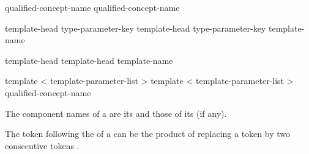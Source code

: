 \documentclass{wg21}
\begin{document}
\begin{bnf}
    \br
    \br
\end{bnf}

\begin{bnf}
    \br
    qualified-concept-name \br
    qualified-concept-name \terminal{<}  \terminal{>}
\end{bnf}

\begin{addedblock}

\begin{bnf}
\br
template-head type-parameter-key  \br
template-head type-parameter-key  \terminal{=}  template-name
\end{bnf}

\begin{bnf}
    \br
    template-head   \br
    template-head   \terminal{=}  template-name
\end{bnf}

\begin{bnf}
    \br
    template < template-parameter-list >   \br
    template < template-parameter-list >   \terminal{=} qualified-concept-name
\end{bnf}

\end{addedblock}

%
The component names of a  are
its  and
those of its  (if any).

\begin{note}
    The \tcode{>} token following the
     of a
    can be the product of replacing a
    \tcode{>>} token by two consecutive \tcode{>}
    tokens .
\end{note}
\end{document}
